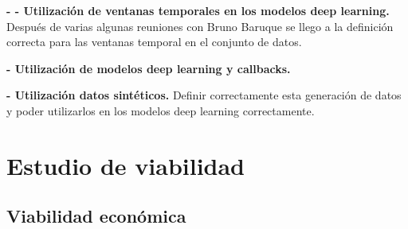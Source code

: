 \textbf{- - Utilización de ventanas temporales en los modelos deep learning.} Después de varias algunas reuniones con Bruno Baruque se llego a la definición correcta para las ventanas temporal en el conjunto de datos.

\textbf{- Utilización de modelos deep learning y callbacks.}

\textbf{- Utilización datos sintéticos.} Definir correctamente esta generación de datos y poder utilizarlos en los modelos deep learning correctamente.




\section{Estudio de viabilidad}


\subsection{Viabilidad económica}

